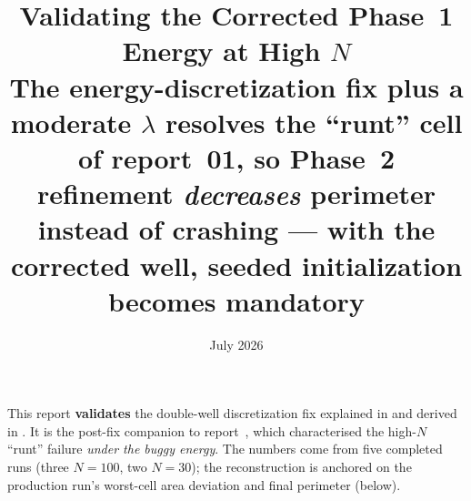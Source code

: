 \documentclass[11pt,a4paper]{article}
\title{\textbf{Validating the Corrected Phase~1 Energy at High \(N\)}\\[0.5em]
  \large The energy-discretization fix plus a moderate \(\lambda\) resolves the
  ``runt'' cell of report~01, so Phase~2 refinement \emph{decreases} perimeter
  instead of crashing --- with the corrected well, seeded initialization becomes
  mandatory}
\author{}
\date{July 2026}
\begin{document}
\maketitle

\begin{tcolorbox}[colback=green!5!white, colframe=green!55!black,
                  title={Status --- measured: the fix is validated end-to-end at
                  N=30 and N=100 on the torus},
                  fontupper=\small]
This report \textbf{validates} the double-well discretization fix explained in
 and derived in
. It is the post-fix companion
to report~, which characterised the
high-\(N\) ``runt'' failure \emph{under the buggy energy}. The numbers come from five
completed runs (three \(N{=}100\), two \(N{=}30\)); the reconstruction is anchored on
the production run's worst-cell area deviation and final perimeter (below).
\end{tcolorbox}
\end{document}
